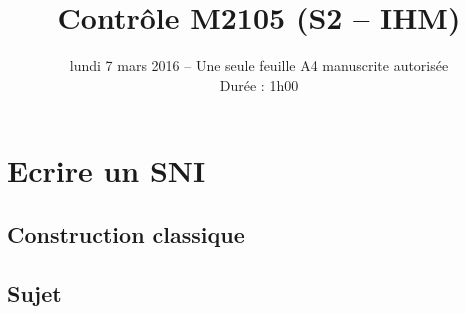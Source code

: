 \documentclass[12pt]{article}
\title{\vspace{-3pc}\textbf{Contr\^ole M2105 (S2 -- 	IHM)}}
\date{lundi 7 mars 2016 -- Une seule feuille A4 manuscrite autoris\'ee\\
Dur\'ee : 1h00}
\begin{document}
\maketitle

\begin{center}
\end{center}

\section{Ecrire un SNI}

\subsection{Construction classique}

\subsection*{Sujet}
\end{document}
